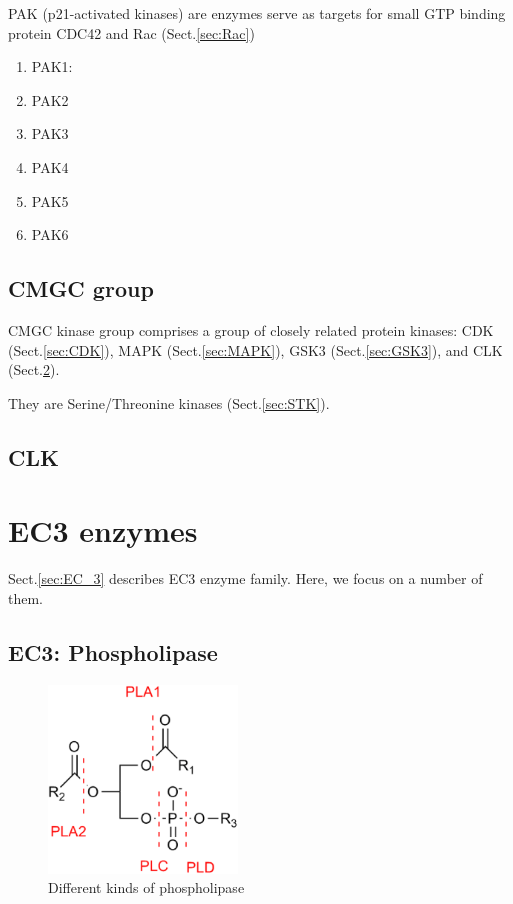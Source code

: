 PAK (p21-activated kinases) are enzymes serve as targets for small GTP binding
protein CDC42 and Rac (Sect.\ref{sec:Rac})
\begin{enumerate}
  \item PAK1: 
  \item PAK2
  \item PAK3
  \item PAK4
  \item PAK5
  \item PAK6
\end{enumerate}

\section{CMGC group}
\label{sec:CMGC-group}

CMGC kinase group comprises a group of closely related protein kinases:
CDK (Sect.\ref{sec:CDK}), MAPK (Sect.\ref{sec:MAPK}), GSK3
(Sect.\ref{sec:GSK3}), and CLK (Sect.\ref{sec:CLK}).

They are Serine/Threonine kinases (Sect.\ref{sec:STK}).

\section{CLK}
\label{sec:CLK}



\chapter{EC3 enzymes}
\label{chap:EC3-enzymes}


Sect.\ref{sec:EC_3} describes EC3 enzyme family.
Here, we focus on a number of them.

\section{EC3: Phospholipase}
\label{sec:phospholipase}

\begin{figure}[hbt]
  \centerline{\includegraphics[height=5cm,
    angle=0]{./images/phospholipase.eps}}
\caption{Different kinds of phospholipase}
\label{fig:phospholipase}
\end{figure}


